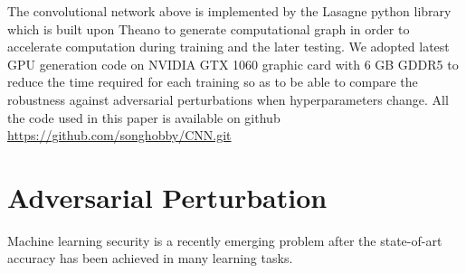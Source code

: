 \documentclass{article}
\begin{document}
The convolutional network above is implemented by the Lasagne\cite{Lasagne} python library which is built upon Theano\cite{Theano} to generate computational graph in order to accelerate computation during training and the later testing.
We adopted latest GPU generation code on NVIDIA GTX 1060 graphic card with 6 GB GDDR5 to reduce the time required for each training so as to be able to compare the robustness against adversarial perturbations when hyperparameters change.
All the code used in this paper is available on github \url{https://github.com/songhobby/CNN.git}

\section{Adversarial Perturbation}
Machine learning security is a recently emerging problem after the state-of-art accuracy has been achieved in many learning tasks.





\end{document}

